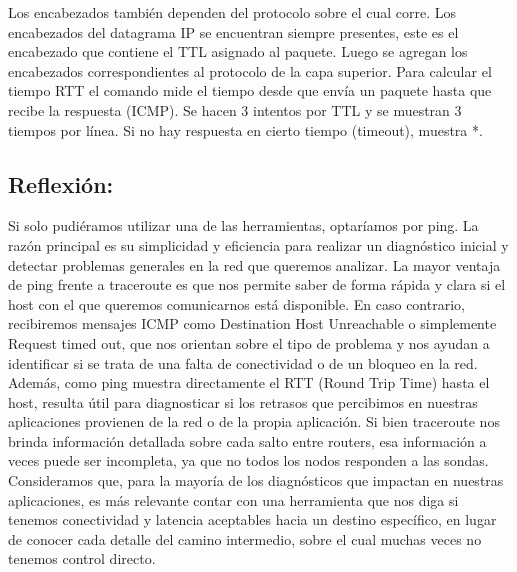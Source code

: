 \documentclass[12pt]{article} %
\begin{document}
\newline
\newline
Los encabezados también dependen del protocolo sobre el cual corre. Los encabezados del datagrama IP se encuentran siempre presentes, este es el encabezado que contiene el TTL asignado al paquete. Luego se agregan los encabezados correspondientes al protocolo de la capa superior.
\newline
\newline
Para calcular el tiempo RTT el comando mide el tiempo desde que envía un paquete hasta que recibe la respuesta (ICMP). Se hacen 3 intentos por TTL y se muestran 3 tiempos por línea. Si no hay respuesta en cierto tiempo (timeout), muestra *.

\subsection{Reflexión:}
Si solo pudiéramos utilizar una de las herramientas, optaríamos por ping. La razón principal es su simplicidad y eficiencia para realizar un diagnóstico inicial y detectar problemas generales en la red que queremos analizar.
\newline
\newline
La mayor ventaja de ping frente a traceroute es que nos permite saber de forma rápida y clara si el host con el que queremos comunicarnos está disponible. En caso contrario, recibiremos mensajes ICMP como Destination Host Unreachable o simplemente Request timed out, que nos orientan sobre el tipo de problema y nos ayudan a identificar si se trata de una falta de conectividad o de un bloqueo en la red.
\newline
\newline
Además, como ping muestra directamente el RTT (Round Trip Time) hasta el host, resulta útil para diagnosticar si los retrasos que percibimos en nuestras aplicaciones provienen de la red o de la propia aplicación.
\newline
\newline
Si bien traceroute nos brinda información detallada sobre cada salto entre routers, esa información a veces puede ser incompleta, ya que no todos los nodos responden a las sondas. Consideramos que, para la mayoría de los diagnósticos que impactan en nuestras aplicaciones, es más relevante contar con una herramienta que nos diga si tenemos conectividad y latencia aceptables hacia un destino específico, en lugar de conocer cada detalle del camino intermedio, sobre el cual muchas veces no tenemos control directo.
\end{document}
